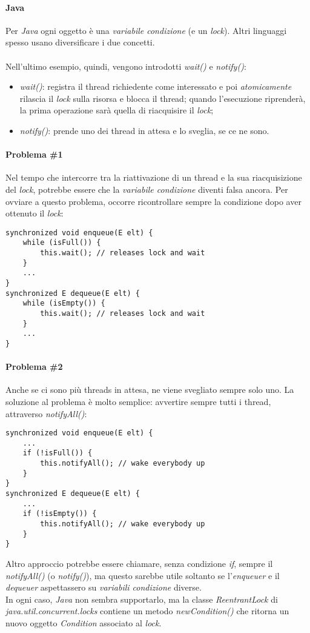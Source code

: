 \paragraph{Java}
Per \textit{Java} ogni oggetto è una \textit{variabile condizione} (e un \textit{lock}). Altri linguaggi spesso usano diversificare i due concetti. \\\\

Nell'ultimo esempio, quindi, vengono introdotti \textit{wait()} e \textit{notify()}:
\begin{itemize}
	\item \textit{wait()}: registra il thread richiedente come interessato e poi \textit{atomicamente} rilascia il \textit{lock} sulla risorsa e blocca il thread; quando l'esecuzione riprenderà, la prima operazione sarà quella di riacquisire il \textit{lock};
	\item \textit{notify()}: prende uno dei thread in attesa e lo sveglia, se ce ne sono.
\end{itemize}

\paragraph{Problema \#1}
Nel tempo che intercorre tra la riattivazione di un thread e la sua riacquisizione del \textit{lock}, potrebbe essere che la \textit{variabile condizione} diventi falsa ancora. Per ovviare a questo problema, occorre ricontrollare sempre la condizione dopo aver ottenuto il \textit{lock}:
\begin{lstlisting}
synchronized void enqueue(E elt) {
	while (isFull()) {
		this.wait(); // releases lock and wait
	}
	...
}
synchronized E dequeue(E elt) {
	while (isEmpty()) {
		this.wait(); // releases lock and wait
	}
	...
}
\end{lstlisting}

\paragraph{Problema \#2}
Anche se ci sono più threads in attesa, ne viene svegliato sempre solo uno. La soluzione al problema è molto semplice: avvertire sempre tutti i thread, attraverso \textit{notifyAll()}:
\begin{lstlisting}
synchronized void enqueue(E elt) {
	...
	if (!isFull()) {
		this.notifyAll(); // wake everybody up
	}
}
synchronized E dequeue(E elt) {
	...
	if (!isEmpty()) {
		this.notifyAll(); // wake everybody up
	}
}
\end{lstlisting}
Altro approccio potrebbe essere chiamare, senza condizione \textit{if}, sempre il \textit{notifyAll()} (o \textit{notify()}), ma questo sarebbe utile soltanto se l'\textit{enqueuer} e il \textit{dequeuer} aspettassero su \textit{variabili condizione} diverse. \\
In ogni caso, \textit{Java} non sembra supportarlo, ma la classe \textit{ReentrantLock} di \textit{java.util.concurrent.locks} contiene un metodo \textit{newCondition()} che ritorna un nuovo oggetto \textit{Condition} associato al \textit{lock}.